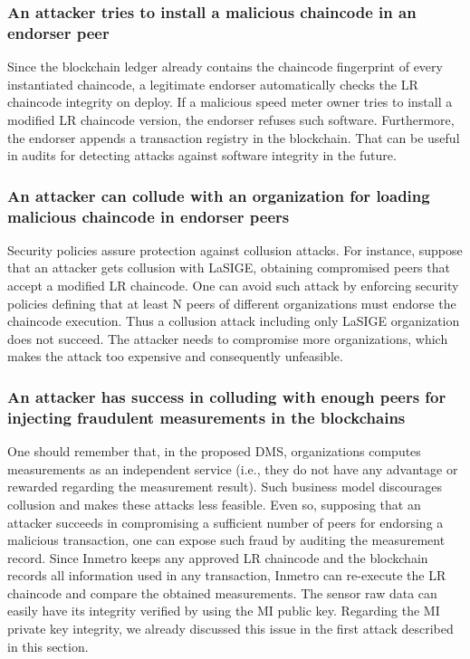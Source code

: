\documentclass[journal]{IEEEtran}
\begin{document}
\subsubsection{An attacker tries to install a malicious chaincode in an endorser peer}
Since the blockchain ledger already contains the chaincode fingerprint of every instantiated chaincode, a legitimate endorser automatically checks the LR chaincode integrity on deploy.
If a malicious speed meter owner tries to install a modified LR chaincode version, the endorser refuses such software.
Furthermore, the endorser appends a transaction registry in the blockchain.
That can be useful in audits for detecting attacks against software integrity in the future.

\subsubsection{An attacker can collude with an organization for loading malicious chaincode in endorser peers}
Security policies assure protection against collusion attacks.
For instance, suppose that an attacker gets collusion with LaSIGE, obtaining compromised peers that accept a modified LR chaincode.
One can avoid such attack by enforcing security policies defining that at least N peers of different organizations must endorse the chaincode execution.
Thus a collusion attack including only LaSIGE organization does not succeed.
The attacker needs to compromise more organizations, which makes the attack too expensive and consequently unfeasible.

\subsubsection{An attacker has success in colluding with enough peers for injecting fraudulent measurements in the blockchains}
One should remember that, in the proposed DMS, organizations computes measurements as an independent service (i.e., they do not have any advantage or rewarded regarding the measurement result).
Such business model discourages collusion and makes these attacks less feasible.
Even so, supposing that an attacker succeeds in compromising a sufficient number of peers for endorsing a malicious transaction, one can expose such fraud by auditing the measurement record.
Since Inmetro keeps any approved LR chaincode and the blockchain records all information used in any transaction, Inmetro can re-execute the LR chaincode and compare the obtained measurements.
The sensor raw data can easily have its integrity verified by using the MI public key.
Regarding the MI private key integrity, we already discussed this issue in the first attack described in this section.
\end{document}
